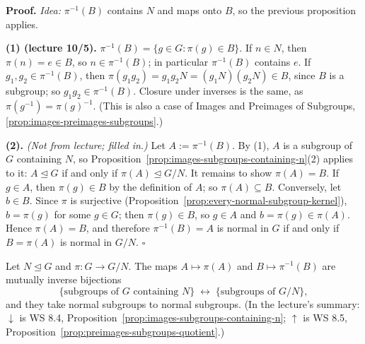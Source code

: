 \documentclass[11pt]{report}
\renewenvironment{proof}[1][Proof]{\noindent\textbf{#1.} }{\hfill$\square$\par\vspace{5pt}}
\begin{document}
\begin{proof}
\textit{Idea:} $\pi^{-1}(B)$ contains $N$ and maps onto $B$, so the previous proposition applies.\par
\textbf{(1) (lecture 10/5).} $\pi^{-1}(B) = \{g \in G : \pi(g) \in B\}$. If $n \in N$, then $\pi(n) = e \in B$, so $n \in \pi^{-1}(B)$; in particular $\pi^{-1}(B)$ contains $e$. If $g_1, g_2 \in \pi^{-1}(B)$, then $\pi(g_1g_2) = g_1g_2N = (g_1N)(g_2N) \in B$, since $B$ is a subgroup; so $g_1g_2 \in \pi^{-1}(B)$. Closure under inverses is the same, as $\pi(g^{-1}) = \pi(g)^{-1}$. (This is also a case of Images and Preimages of Subgroups, \ref{prop:images-preimages-subgroups}.)

\textbf{(2).} \textit{(Not from lecture; filled in.)} Let $A := \pi^{-1}(B)$. By (1), $A$ is a subgroup of $G$ containing $N$, so Proposition~\ref{prop:images-subgroups-containing-n}(2) applies to it: $A \trianglelefteq G$ if and only if $\pi(A) \trianglelefteq G/N$. It remains to show $\pi(A) = B$. If $g \in A$, then $\pi(g) \in B$ by the definition of $A$; so $\pi(A) \subseteq B$. Conversely, let $b \in B$. Since $\pi$ is surjective (Proposition~\ref{prop:every-normal-subgroup-kernel}), $b = \pi(g)$ for some $g \in G$; then $\pi(g) \in B$, so $g \in A$ and $b = \pi(g) \in \pi(A)$. Hence $\pi(A) = B$, and therefore $\pi^{-1}(B) = A$ is normal in $G$ if and only if $B = \pi(A)$ is normal in $G/N$.
\end{proof}

\begin{thmbox}\label{thm:correspondence}
Let $N \trianglelefteq G$ and $\pi: G \to G/N$. The maps $A \mapsto \pi(A)$ and $B \mapsto \pi^{-1}(B)$ are mutually inverse bijections
\[ \{\text{subgroups of } G \text{ containing } N\} \;\longleftrightarrow\; \{\text{subgroups of } G/N\}, \]
and they take normal subgroups to normal subgroups. (In the lecture's summary: $\downarrow$ is WS 8.4, Proposition~\ref{prop:images-subgroups-containing-n}; $\uparrow$ is WS 8.5, Proposition~\ref{prop:preimages-subgroups-quotient}.)
\end{thmbox}
\end{document}
